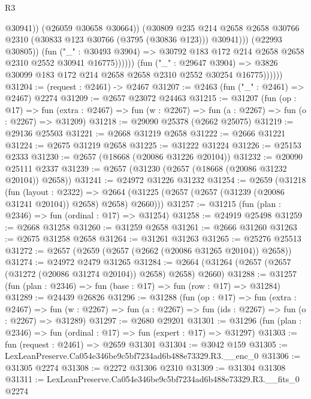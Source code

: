 \begin{lexlean}{R3}
\begin{coremodule}
                                    @30941))
                                (@26059 @30658 @30664))
                              (@30809
                                @235
                                @214
                                @2658
                                @2658
                                @30766
                                @2310
                                (@30833 @123 @30766 (@3795 (@30836 @123)))
                                @30941)))
                          (@22993 @30805))
                        (fun ("_" : @30493 @3904) =>
                        @30792 @183 @172 @214 @2658 @2658 @2310 @2552 @30941 @16775))))))
              (fun ("_" : @29647 @3904) =>
              @3826 @30099 @183 @172 @214 @2658 @2658 @2310 @2552 @30254 @16775))))))
@31204 := (request : @2461) -> @2467
@31207 := @2463 (fun ("_" : @2461) => @2467) @2274
@31209 := @2657 @23072 @24463
@31215 := @31207
    (fun (op : @17) =>
    fun (extra : @2467) => fun (w : @2267) => fun (a : @2267) => fun (o : @2267) => @31209)
@31218 := @29090 @25378 (@2662 @25075)
@31219 := @29136 @25503
@31221 := @2668 @31219 @2658
@31222 := @2666 @31221
@31224 := @2675 @31219 @2658
@31225 := @31222 @31224
@31226 := @25153 @2333
@31230 := @2657 (@18668 (@20086 @31226 @20104))
@31232 := @20090 @25111 @2337
@31239 := @2657 (@31230 (@2657 (@18668 (@20086 @31232 @20104)) @2658))
@31241 := @24972 @31226 @31232
@31254 := @2659
    (@31218
      (fun (layout : @2322) =>
      @2664 (@31225 (@2657 (@2657 (@31239 (@20086 @31241 @20104)) @2658) @2658) @2660)))
@31257 := @31215 (fun (plan : @2346) => fun (ordinal : @17) => @31254)
@31258 := @24919 @25498
@31259 := @2668 @31258
@31260 := @31259 @2658
@31261 := @2666 @31260
@31263 := @2675 @31258 @2658
@31264 := @31261 @31263
@31265 := @25276 @25513
@31272 := @2657 (@2659 (@2657 (@2662 (@20086 @31265 @20104)) @2658))
@31274 := @24972 @2479 @31265
@31284 := @2664 (@31264 (@2657 (@2657 (@31272 (@20086 @31274 @20104)) @2658) @2658) @2660)
@31288 := @31257 (fun (plan : @2346) => fun (base : @17) => fun (row : @17) => @31284)
@31289 := @24439 @26826
@31296 := @31288
    (fun (op : @17) =>
    fun (extra : @2467) =>
    fun (w : @2267) => fun (a : @2267) => fun (ids : @2267) => fun (o : @2267) => @31289)
@31297 := @2680 @29201
@31301 := @31296 (fun (plan : @2346) => fun (ordinal : @17) => fun (expert : @17) => @31297)
@31303 := fun (request : @2461) => @2659 @31301
@31304 := @3042 @159
@31305 := LexLeanPreserve.Ca054e346be9c5bf7234ad6b488e73329.R3.__enc_0
@31306 := @31305 @2274
@31308 := @2272 @31306 @2310
@31309 := @31304 @31308
@31311 := LexLeanPreserve.Ca054e346be9c5bf7234ad6b488e73329.R3.__fits_0 @2274

\end{coremodule}
\end{lexlean}
